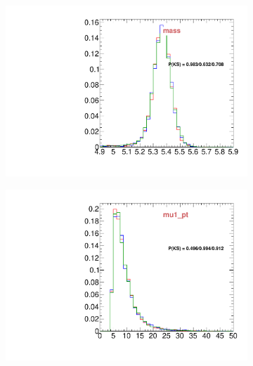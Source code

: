 \begin{figure}
\begin{subfigure}[b]{0.2\textwidth}
                \includegraphics[width=\textwidth]{Figures/VariablesComparison/MC_endcaps_figs_3h/mass}
                \label{fig:MC_endcaps_mass_3h}
        \end{subfigure}
        \begin{subfigure}[b]{0.2\textwidth}
                \centering
                \includegraphics[width=\textwidth]{Figures/VariablesComparison/MC_endcaps_figs_3h/mu1_pt}
                \label{fig:MC_endcaps_mu1_pt_3h}
        \end{subfigure}
        \begin{subfigure}[b]{0.2\textwidth}
                \centering

\end{subfigure}
\end{figure}
